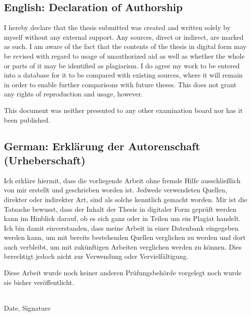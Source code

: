 \documentclass[a4paper,11pt,oneside]{article}
\begin{document}
  \subsection*{English: Declaration of Authorship}
 
  I hereby declare that the thesis submitted was created and written
  solely by myself without any external support. Any sources, direct
  or indirect, are marked as such. I am aware of the fact that the
  contents of the thesis in digital form may be revised with regard to
  usage of unauthorized aid as well as whether the whole or parts of
  it may be identified as plagiarism. I do agree my work to be entered
  into a database for it to be compared with existing sources, where
  it will remain in order to enable further comparisons with future
  theses. This does not grant any rights of reproduction and usage,
  however.

  This document was neither presented to any other examination board
  nor has it been published.

  \subsection*{German: Erklärung der Autorenschaft (Urheberschaft)}
 
  Ich erkläre hiermit, dass die vorliegende Arbeit ohne fremde Hilfe
  ausschließlich von mir erstellt und geschrieben worden ist. Jedwede
  verwendeten Quellen, direkter oder indirekter Art, sind als solche
  kenntlich gemacht worden. Mir ist die Tatsache bewusst, dass der
  Inhalt der Thesis in digitaler Form geprüft werden kann im Hinblick
  darauf, ob es sich ganz oder in Teilen um ein Plagiat handelt. Ich
  bin damit einverstanden, dass meine Arbeit in einer Datenbank
  eingegeben werden kann, um mit bereits bestehenden Quellen
  verglichen zu werden und dort auch verbleibt, um mit zukünftigen
  Arbeiten verglichen werden zu können. Dies berechtigt jedoch nicht
  zur Verwendung oder Vervielfältigung.

  Diese Arbeit wurde noch keiner anderen Prüfungsbehörde vorgelegt
  noch wurde sie bisher veröffentlicht.

  \vspace{20mm}

  \dotfill\\
  Date, Signature

  \newpage
\end{document}
